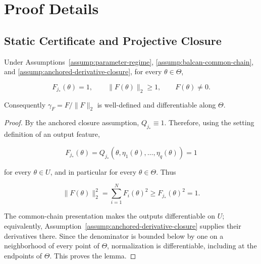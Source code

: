 \appendix

\section{Proof Details}\label{sec:proof-details}

\subsection{Static Certificate and Projective Closure}\label{app:step-001}

\begin{lemma} \label{lem:step-001-anchor}

Under Assumptions~\ref{assump:parameter-regime}, \ref{assump:balcan-common-chain}, and
\ref{assump:anchored-derivative-closure}, for every \(\theta\in\Theta\),

\begin{equation}
\label{eq:appendix-display-001}
F_{j_*}(\theta)=1,
\qquad
\|F(\theta)\|_2\geq1,
\qquad
F(\theta)\neq0.
\end{equation}

Consequently \(\gamma_F=F/\|F\|_2\) is well-defined and differentiable along \(\Theta\).


\end{lemma}

\begin{proof}
By the anchored closure assumption, \(Q_{j_*}\equiv1\). Therefore, using the
setting definition of an output feature,

\begin{equation}
\label{eq:appendix-display-002}
F_{j_*}(\theta)
=Q_{j_*}(\theta,\eta_1(\theta),\ldots,\eta_q(\theta))
=1
\end{equation}

for every \(\theta\in U\), and in particular for every \(\theta\in\Theta\). Thus

\begin{equation}
\label{eq:appendix-display-003}
\|F(\theta)\|_2^2
=\sum_{i=1}^N F_i(\theta)^2
\geq F_{j_*}(\theta)^2
=1.
\end{equation}

The common-chain presentation makes the outputs differentiable on \(U\);
equivalently, Assumption~\ref{assump:anchored-derivative-closure} supplies
their derivatives there. Since the denominator is bounded below by one on a
neighborhood of every point of \(\Theta\), normalization is differentiable, including at the endpoints of
\(\Theta\). This proves the lemma. 
\end{proof}

